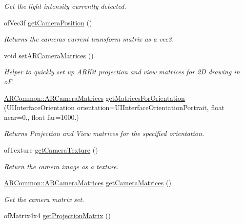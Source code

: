 \begin{DoxyCompactItemize}
\begin{DoxyCompactList}\small\item\em Get the light intensity currently detected. \end{DoxyCompactList}\item 
of\+Vec3f \hyperlink{class_a_r_processor_a06030d617c338b3c395c48498733ddb7}{get\+Camera\+Position} ()
\begin{DoxyCompactList}\small\item\em Returns the camera\textquotesingle{}s current transform matrix as a vec3. \end{DoxyCompactList}\item 
void \hyperlink{class_a_r_processor_a2ffd8b9518388be29eba6affe4d4d152}{set\+A\+R\+Camera\+Matrices} ()
\begin{DoxyCompactList}\small\item\em Helper to quickly set up A\+R\+Kit projection and view matrices for 2D drawing in oF. \end{DoxyCompactList}\item 
\hyperlink{struct_a_r_common_1_1_a_r_camera_matrices}{A\+R\+Common\+::\+A\+R\+Camera\+Matrices} \hyperlink{class_a_r_processor_abcd684d805e880aed72c2eb56a65978f}{get\+Matrices\+For\+Orientation} (U\+I\+Interface\+Orientation orientation=U\+I\+Interface\+Orientation\+Portrait, float near=0., float far=1000.)
\begin{DoxyCompactList}\small\item\em Returns Projection and View matrices for the specified orientation. \end{DoxyCompactList}\item 
of\+Texture \hyperlink{class_a_r_processor_a5eb8045000bc6e0ad3d41d7bbf832047}{get\+Camera\+Texture} ()
\begin{DoxyCompactList}\small\item\em Return the camera image as a texture. \end{DoxyCompactList}\item 
\hyperlink{struct_a_r_common_1_1_a_r_camera_matrices}{A\+R\+Common\+::\+A\+R\+Camera\+Matrices} \hyperlink{class_a_r_processor_a82a9b334360ebccd844e7cf5584eff8b}{get\+Camera\+Matrices} ()
\begin{DoxyCompactList}\small\item\em Get the camera matrix set. \end{DoxyCompactList}\item 
of\+Matrix4x4 \hyperlink{class_a_r_processor_a0f7cf764c73a8fc3964be088156766ea}{get\+Projection\+Matrix} ()

\end{DoxyCompactItemize}
